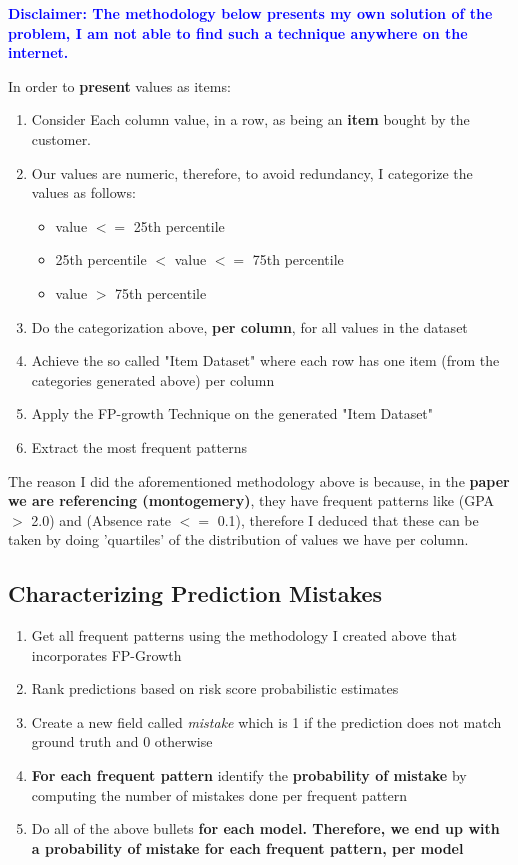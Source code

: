 \documentclass{article}
\begin{document}
\textbf{\textcolor{blue}{Disclaimer: The methodology below presents my own solution of the problem, I am not able to find such a technique anywhere on the internet.}}

In order to \textbf{present} values as items:
\begin{enumerate}
\item Consider Each column value, in a row, as being an \textbf{item} bought by the customer.
\item Our values are numeric, therefore, to avoid redundancy, I categorize the values as follows:
\begin{itemize}
\item value $<=$ 25th percentile
\item 25th percentile $<$ value $<=$ 75th percentile
\item value $>$ 75th percentile
\end{itemize}
\item Do the categorization above, \textbf{per column}, for all values in the dataset
\item Achieve the so called "Item Dataset" where each row has one item (from the categories generated above) per column
\item Apply the FP-growth Technique on the generated "Item Dataset"
\item Extract the most frequent patterns
\end{enumerate}

The reason I did the aforementioned methodology above is because, in the \textbf{paper we are referencing (montogemery)}, they have frequent patterns like (GPA $>$ 2.0) and (Absence rate $<=$ 0.1), therefore I deduced that these can be taken by doing 'quartiles' of the distribution of values we have per column.

\subsection{Characterizing Prediction Mistakes}
\begin{enumerate}
\item Get all frequent patterns using the methodology I created above that incorporates FP-Growth
\item Rank predictions based on risk score probabilistic estimates

\item Create a new field called \textit{mistake} which is 1 if the prediction does not match ground truth and 0 otherwise

\item \textbf{For each frequent pattern} identify the \textbf{probability of mistake} by computing the number of mistakes done per frequent pattern

\item Do all of the above bullets \textbf{for each model. Therefore, we end up with a probability of mistake for each frequent pattern, per model}
\end{enumerate} 
\end{document}
